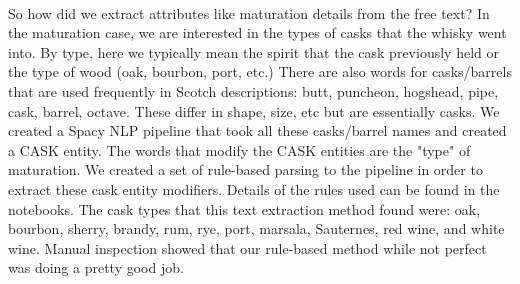 \documentclass{article}
\begin{document}
 	\paragraph{} So how did we extract attributes like maturation details from the free text? In the maturation case, we are interested in the types of casks that the whisky went into. By type, here we typically mean the spirit that the cask previously held or the type of wood (oak, bourbon, port, etc.) There are also words for casks/barrels that are used frequently in Scotch descriptions: butt, puncheon, hogshead, pipe, cask, barrel, octave. These differ in shape, size, etc but are essentially casks.
 	 We created a Spacy NLP pipeline that took all these casks/barrel names and created a CASK entity. The words that modify the CASK entities are the "type" of maturation. We created a set of rule-based parsing to the pipeline in order to extract these cask entity modifiers. Details of the rules used can be found in the notebooks. The cask types that this text extraction method found were: oak, bourbon, sherry, brandy, rum, rye, port, marsala, Sauternes, red wine, and white wine. Manual inspection showed that our rule-based method while not perfect was doing a pretty good job.
\end{document}
